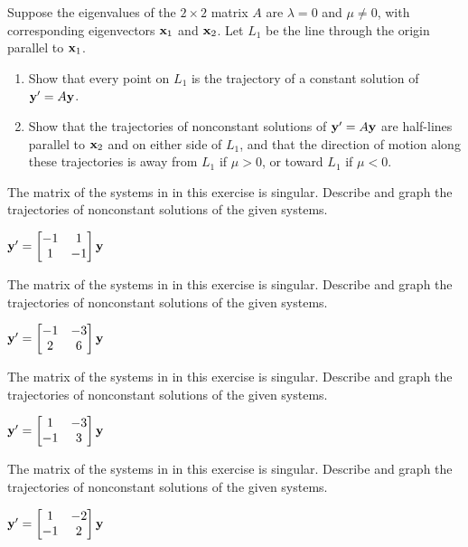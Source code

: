\documentclass{ximera}
\begin{document}
\begin{problem}\label{exer:10.4.35}
Suppose the eigenvalues of the $2\times 2$
matrix $A$ are $\lambda=0$ and $\mu\ne0$, with
corresponding  eigenvectors ${\bf x}_1$ and ${\bf x}_2$.
Let $L_1$ be the line through the origin parallel to ${\bf x}_1$.
\begin{enumerate}
\item %
Show that every point on $L_1$ is the trajectory of a constant
solution of ${\bf y}'=A{\bf y}$.
\item %
Show that the trajectories of nonconstant solutions of ${\bf y}'=A{\bf
y}$ are half-lines parallel to ${\bf x}_2$ and on either side of
$L_1$, and that the direction of motion along these trajectories is
away from $L_1$ if $\mu>0$, or toward $L_1$ if $\mu<0$.
\end{enumerate}
\end{problem}


\begin{problem}\label{exer:10.4.36}
The matrix of the systems in
in this exercise is singular. Describe
and graph the trajectories of nonconstant solutions  of the given
systems.

${\bf y}'= \begin{bmatrix}-1&1\\1&-1\end{bmatrix}{\bf y}$
\end{problem}

\begin{problem}\label{exer:10.4.37}
The matrix of the systems in
in this exercise is singular. Describe
and graph the trajectories of nonconstant solutions  of the given
systems.

${\bf y}'= \begin{bmatrix}-1 &-3\\2 &6\end{bmatrix}{\bf
y}$
\end{problem}


\begin{problem}\label{exer:10.4.38}
The matrix of the systems in
in this exercise is singular. Describe
and graph the trajectories of nonconstant solutions  of the given
systems.

${\bf y}'= \begin{bmatrix}1 &-3\\-1 &3\end{bmatrix}{\bf
y}$
\end{problem}

\begin{problem}\label{exer:10.4.39}
The matrix of the systems in
in this exercise is singular. Describe
and graph the trajectories of nonconstant solutions  of the given
systems.

${\bf y}'= \begin{bmatrix}1 &-2\\-1 &2\end{bmatrix}{\bf y}$
\end{problem}
\end{document}
